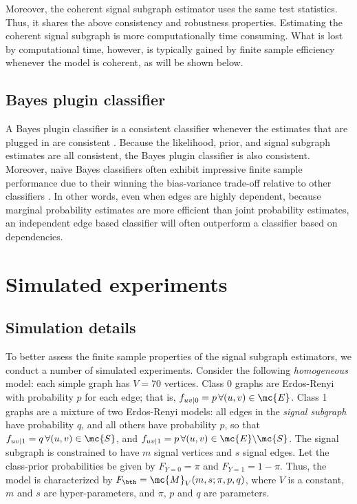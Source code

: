 \documentclass[10pt,journal,cspaper,compsoc]{IEEEtran}
\begin{document}
Moreover, the coherent signal subgraph estimator uses the same test statistics.  Thus, it shares the above consistency and robustness properties.  Estimating the coherent signal subgraph is more computationally time consuming. What is lost by computational time, however, is typically gained by finite sample efficiency whenever the model is coherent, as will be shown below.


\subsection{Bayes plugin classifier}

A Bayes plugin classifier is a consistent classifier whenever the estimates that are plugged in are consistent \cite{Bickel2000}.  Because the likelihood, prior, and signal subgraph estimates are all consistent, the Bayes plugin classifier is also consistent.  Moreover, na\"ive Bayes classifiers often exhibit impressive finite sample performance due to their winning the bias-variance trade-off relative to other classifiers \cite{Hand2001}.  In other words, even when edges are highly dependent, because marginal probability estimates are more efficient than joint probability estimates, an independent edge based classifier will often outperform a classifier based on dependencies.






\section{Simulated experiments} %
\label{sub:subsection_name}

\subsection{Simulation details} %
\label{sub:simulation_details}

To better assess the finite sample properties of the signal subgraph estimators, we conduct a number of simulated experiments.  Consider the following \emph{homogeneous} model: each simple graph has $V=70$ vertices.  Class 0 graphs are Erdos-Renyi with probability $p$ for each edge; that is, $f_{uv|0}=p \, \forall (u,v) \in \mc{E}$.  Class 1 graphs are a mixture of two Erdos-Renyi models: all edges in the \emph{signal subgraph} have probability $q$, and all others have probability $p$, so that $f_{uv|1}=q \, \forall (u,v) \in \mc{S}$, and $f_{uv|1}=p \, \forall (u,v) \in \mc{E} \backslash \mc{S}$.  The signal subgraph is constrained to have $m$ signal vertices and $s$ signal edges.  Let the class-prior probabilities be given by $F_{Y=0}=\pi$ and $F_{Y=1}=1-\pi$. Thus, the model is characterized by $F_{\bth}=\mc{M}_V(m,s; \pi,p,q)$, where $V$ is a constant, $m$ and $s$ are hyper-parameters, and $\pi$, $p$ and $q$ are parameters.  
\end{document}
